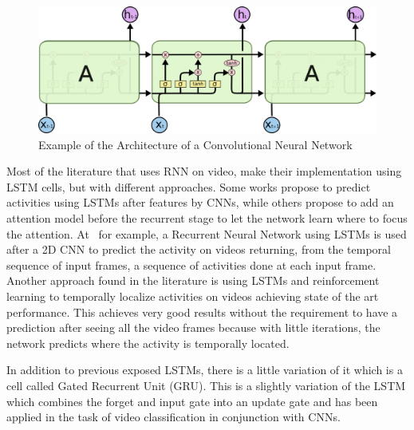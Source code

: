 

\begin{figure}[ht]
\begin{center}
\includegraphics[width=0.8\linewidth]{img/stateofart/lstm_chain}
\end{center}
\caption{Example of the Architecture of a Convolutional Neural Network}
\label{fig:lstm_chain}
\end{figure}

Most of the literature that uses RNN on video, make their implementation using LSTM cells, but with different approaches. Some works propose to predict activities using LSTMs after features by CNNs\cite{yao2015describing}, while others propose to add an attention model before the recurrent stage to let the network learn where to focus the attention\cite{sharma2015action}\cite{piergiovanni2016temporal}. At~\cite{yeung2015every} for example, a Recurrent Neural Network using LSTMs is used after a 2D CNN to predict the activity on videos returning, from the temporal sequence of input frames, a sequence of activities done at each input frame.
Another approach found in the literature is using LSTMs and reinforcement learning to temporally localize activities on videos\cite{yeung2015end} achieving state of the art performance. This achieves very good results without the requirement to have a prediction after seeing all the video frames because with little iterations, the network predicts where the activity is temporally located.

In addition to previous exposed LSTMs, there is a little variation of it which is a cell called Gated Recurrent Unit (GRU)\cite{cho2014learning}. This is a slightly variation of the LSTM which combines the forget and input gate into an update gate and has been applied in the task of video classification\cite{ballas2015delving} in conjunction with CNNs.

